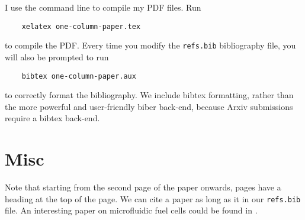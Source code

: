 I use the command line to compile my PDF files.
Run
\begin{verbatim}
	xelatex one-column-paper.tex
\end{verbatim}
to compile the PDF.
Every time you modify the \verb+refs.bib+ bibliography file, you will also be prompted to run
\begin{verbatim}
	bibtex one-column-paper.aux
\end{verbatim}
to correctly format the bibliography.
We include bibtex formatting, rather than the more powerful and user-friendly biber back-end, because Arxiv submissions require a bibtex back-end.



%
%

\section{Misc}

Note that starting from the second page of the paper onwards, pages have a heading at the top of the page.
We can cite a paper as long as it in our \verb+refs.bib+ file.
An interesting paper on microfluidic fuel cells could be found in \cite{vigolo-stone-rsc-2014}.

